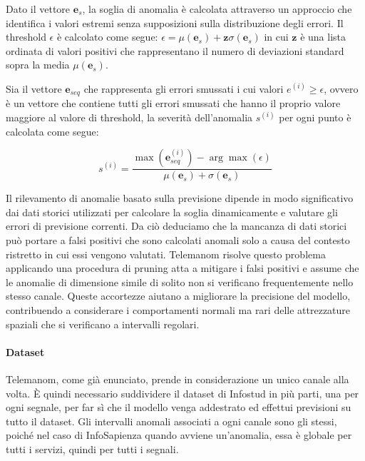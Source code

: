     Dato il vettore $\mathbf{e}_s$, la soglia di anomalia è calcolata attraverso un approccio che identifica i valori estremi 
    senza supposizioni sulla distribuzione degli errori. 
    Il threshold $\epsilon$ è calcolato come segue: 
    $\epsilon = \mu(\mathbf{e}_s) + \mathbf{z}\sigma(\mathbf{e}_s)$ in cui $\mathbf{z}$ è una lista ordinata di valori 
    positivi che rappresentano il numero di deviazioni standard sopra la media $\mu(\mathbf{e}_s)$. 

    Sia il vettore $\mathbf{e}_{seq}$ che rappresenta gli errori smussati i cui valori $e^{(i)} \geq \epsilon$, 
    ovvero è un vettore che contiene tutti gli errori smussati che hanno il proprio valore maggiore al valore di threshold, la severità 
    dell'anomalia $s^{(i)}$ per ogni punto è calcolata come segue:

    \[s^{(i)} = \frac{\max(\mathbf{e}_{seq}^{(i)}) - \arg \max(\epsilon)}{\mu(\mathbf{e}_s) + \sigma(\mathbf{e}_s)}\]

    Il rilevamento di anomalie basato sulla previsione dipende in modo significativo dai dati storici utilizzati
    per calcolare la soglia dinamicamente e valutare gli errori di previsione correnti. Da ciò deduciamo che la 
    mancanza di dati storici può portare a falsi positivi che sono calcolati anomali solo a causa del contesto ristretto 
    in cui essi vengono valutati. Telemanom risolve questo problema applicando una procedura di pruning atta a mitigare 
    i falsi positivi e assume che le anomalie di dimensione simile di solito non si verificano frequentemente 
    nello stesso canale. Queste accortezze aiutano a migliorare la precisione del modello, contribuendo a considerare
    i comportamenti normali ma rari delle attrezzature spaziali che si verificano a intervalli regolari.

    \paragraph{Dataset} Telemanom, come già enunciato, prende in considerazione un unico canale alla volta. È 
    quindi necessario suddividere il dataset di Infostud in più parti, una per ogni segnale, per far sì che il modello 
    venga addestrato ed effettui previsioni su tutto il dataset. Gli intervalli anomali associati a ogni canale sono gli 
    stessi, poiché nel caso di InfoSapienza quando avviene un'anomalia, essa è globale per tutti i servizi, quindi 
    per tutti i segnali.

